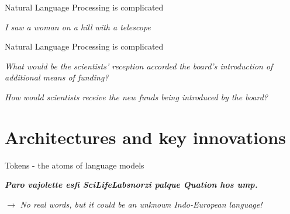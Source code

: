 \documentclass[10pt]{beamer}
\newcommand{\remark}[1]{{\par \color{scGrape} \ensuremath{\rightarrow} \emph{#1}}}
\begin{document}
\begin{frame}[standout]{Natural Language Processing is complicated}
	\begin{center}
			\emph{I saw a woman on a hill with a telescope}
	\end{center}
\end{frame}

\begin{frame}[standout]{Natural Language Processing is complicated}
	\begin{center}
		\emph{What would be the scientists' reception accorded the board's introduction of additional means of funding?}
		\vspace{2cm}\par
		\emph{How would scientists receive the new funds being introduced by the board?}
	\end{center}
\end{frame}


\section{Architectures and key innovations}


\begin{frame}{Tokens - the atoms of language models}
	\begin{center}
		\emph{\large \bfseries Paro vajolette esfi SciLifeLab\linebreak snorzi palque Quation hos ump.}
	\end{center}
  \remark{No real words, but it could be an unknown Indo-European language!}
\end{frame}
\end{document}
